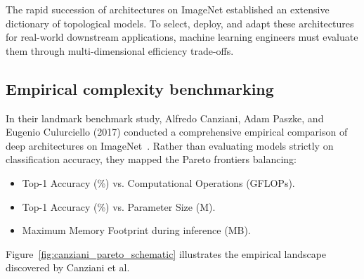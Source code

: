 The rapid succession of architectures on ImageNet established an extensive dictionary of topological models. To select, deploy, and adapt these architectures for real-world downstream applications, machine learning engineers must evaluate them through multi-dimensional efficiency trade-offs.

\subsection{Empirical complexity benchmarking}
\label{sec:canziani_complexity_benchmark}

In their landmark benchmark study, Alfredo Canziani, Adam Paszke, and Eugenio Culurciello (2017) conducted a comprehensive empirical comparison of deep architectures on ImageNet~\cite{canziani2016analysis}. Rather than evaluating models strictly on classification accuracy, they mapped the Pareto frontiers balancing:
\begin{itemize}[noitemsep]
  \item Top-1 Accuracy (\%) vs. Computational Operations (GFLOPs).
  \item Top-1 Accuracy (\%) vs. Parameter Size (M).
  \item Maximum Memory Footprint during inference (MB).
\end{itemize}

Figure~\ref{fig:canziani_pareto_schematic} illustrates the empirical landscape discovered by Canziani et al.


